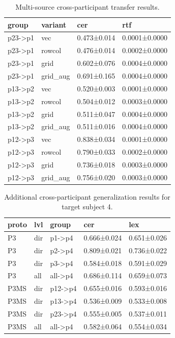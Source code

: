 \begin{table}[t]
\centering
\caption{Multi-source cross-participant transfer results.}
\label{tab:p3ms}
\begin{tabular}{llll}
\hline
group & variant & cer & rtf \\
\hline
p23->p1 & vec & 0.473±0.014 & 0.0001±0.0000 \\
p23->p1 & rowcol & 0.476±0.014 & 0.0002±0.0000 \\
p23->p1 & grid & 0.602±0.076 & 0.0004±0.0000 \\
p23->p1 & grid_aug & 0.691±0.165 & 0.0004±0.0000 \\
p13->p2 & vec & 0.520±0.003 & 0.0001±0.0000 \\
p13->p2 & rowcol & 0.504±0.012 & 0.0003±0.0000 \\
p13->p2 & grid & 0.511±0.047 & 0.0004±0.0000 \\
p13->p2 & grid_aug & 0.511±0.016 & 0.0004±0.0000 \\
p12->p3 & vec & 0.838±0.034 & 0.0001±0.0000 \\
p12->p3 & rowcol & 0.790±0.033 & 0.0002±0.0000 \\
p12->p3 & grid & 0.736±0.018 & 0.0003±0.0000 \\
p12->p3 & grid_aug & 0.756±0.020 & 0.0003±0.0000 \\
\hline
\end{tabular}
\end{table}

\begin{table}[t]
\centering
\caption{Additional cross-participant generalization results for target subject 4.}
\label{tab:to4_generalization}
\begin{tabular}{lllll}
\hline
proto & lvl & group & cer & lex \\
\hline
P3 & dir & p1->p4 & 0.666±0.024 & 0.651±0.026 \\
P3 & dir & p2->p4 & 0.809±0.021 & 0.736±0.022 \\
P3 & dir & p3->p4 & 0.584±0.018 & 0.591±0.029 \\
P3 & all & all->p4 & 0.686±0.114 & 0.659±0.073 \\
P3MS & dir & p12->p4 & 0.655±0.016 & 0.593±0.016 \\
P3MS & dir & p13->p4 & 0.536±0.009 & 0.533±0.008 \\
P3MS & dir & p23->p4 & 0.555±0.005 & 0.537±0.011 \\
P3MS & all & all->p4 & 0.582±0.064 & 0.554±0.034 \\
\hline
\end{tabular}
\end{table}

